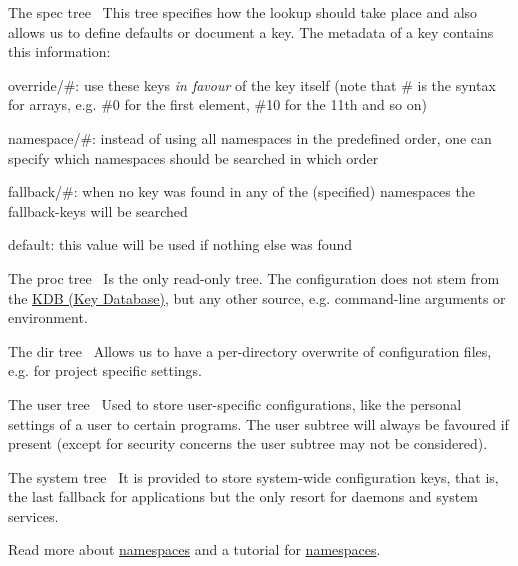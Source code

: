 \begin{DoxyItemize}
\item The {\ttfamily spec} tree~\newline
This tree specifies how the lookup should take place and also allows us to define defaults or document a key. The metadata of a key contains this information\+:
\begin{DoxyItemize}
\item {\ttfamily override/\#}\+: use these keys {\itshape in favour} of the key itself (note that {\ttfamily \#} is the syntax for arrays, e.\+g. {\ttfamily \#0} for the first element, {\ttfamily \#10} for the 11th and so on)
\item {\ttfamily namespace/\#}\+: instead of using all namespaces in the predefined order, one can specify which namespaces should be searched in which order
\item {\ttfamily fallback/\#}\+: when no key was found in any of the (specified) namespaces the {\ttfamily fallback}-\/keys will be searched
\item {\ttfamily default}\+: this value will be used if nothing else was found
\end{DoxyItemize}
\item The {\ttfamily proc} tree~\newline
Is the only read-\/only tree. The configuration does not stem from the \hyperlink{group__kdb}{K\+D\+B (Key Database)}, but any other source, e.\+g. command-\/line arguments or environment.
\item The {\ttfamily dir} tree~\newline
Allows us to have a per-\/directory overwrite of configuration files, e.\+g. for project specific settings.
\item The {\ttfamily user} tree~\newline
Used to store user-\/specific configurations, like the personal settings of a user to certain programs. The user subtree will always be favoured if present (except for security concerns the user subtree may not be considered).
\item The {\ttfamily system} tree~\newline
It is provided to store system-\/wide configuration keys, that is, the last fallback for applications but the only resort for daemons and system services.
\end{DoxyItemize}

Read more about \hyperlink{md_doc_help_elektra-namespaces_doc_help_elektra-namespaces_md}{namespaces} and a tutorial for \hyperlink{doc_tutorials_namespaces_md}{namespaces}.

